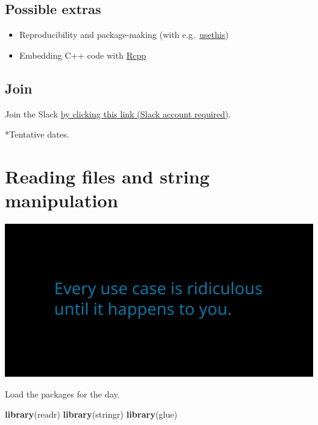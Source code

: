 \documentclass[]{book}
\newenvironment{Shaded}{}{}
\newcommand{\KeywordTok}[1]{\textcolor[rgb]{0.00,0.44,0.13}{\textbf{#1}}}
\newcommand{\NormalTok}[1]{#1}
\providecommand{\tightlist}{%
  \setlength{\itemsep}{0pt}\setlength{\parskip}{0pt}}
\begin{document}
\hypertarget{possible-extras}{%
\section*{Possible extras}\label{possible-extras}}

\begin{itemize}
\tightlist
\item
  Reproducibility and package-making (with e.g.~\href{https://usethis.r-lib.org/}{usethis})\\
\item
  Embedding C++ code with \href{http://adv-r.had.co.nz/Rcpp.html}{Rcpp}
\end{itemize}

\hypertarget{join}{%
\section*{Join}\label{join}}

Join the Slack \href{https://join.slack.com/t/trestidytorial/shared_invite/zt-ejgr3tow-3zisGwPg1JDeTJD33DWb2A}{by clicking this link (Slack account required)}.

*Tentative dates.

\hypertarget{reading-files-and-string-manipulation}{%
\chapter{Reading files and string manipulation}\label{reading-files-and-string-manipulation}}

\includegraphics{opening-image.png}

Load the packages for the day.

\begin{Shaded}
\begin{Highlighting}[]
\KeywordTok{library}\NormalTok{(readr)}
\KeywordTok{library}\NormalTok{(stringr)}
\KeywordTok{library}\NormalTok{(glue)}
\end{Highlighting}
\end{Shaded}
\end{document}
